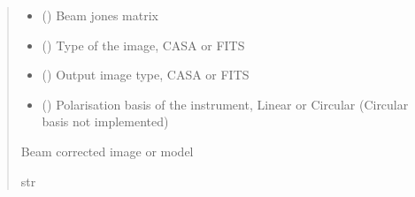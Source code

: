 \documentclass[letterpaper,10pt,english]{sphinxmanual}
\begin{document}
\begin{fulllineitems}
\begin{fulllineitems}
\begin{quote}
\begin{description}
\begin{itemize}
\item {} 
\sphinxAtStartPar
{} () \textendash{} Beam jones matrix

\item {} 
\sphinxAtStartPar
{} () \textendash{} Type of the image, CASA or FITS

\item {} 
\sphinxAtStartPar
{} () \textendash{} Output image type, CASA or FITS

\item {} 
\sphinxAtStartPar
{} () \textendash{} Polarisation basis of the instrument, Linear or Circular (Circular basis not implemented)

\end{itemize}

\item[{Returns}] \leavevmode
\sphinxAtStartPar
Beam corrected image or model

\item[{Return type}] \leavevmode
\sphinxAtStartPar
str

\end{description}\end{quote}

\end{fulllineitems}



\end{fulllineitems}
\end{document}
